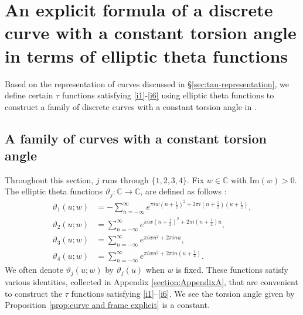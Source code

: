 \documentclass[10pt,leqno]{amsart}
\numberwithin{equation}{section}
\begin{document}
\section{An explicit formula of a discrete curve with a constant torsion angle in terms of elliptic theta functions}\label{section:An explicit formula of closed discrete space curve with constant torsion angle}
Based on the representation of curves 
discussed in \S \ref{sec:tau-representation},
we define certain $\tau$ functions satisfying \eqref{i1}-\eqref{i6} using elliptic theta functions to
construct a family of discrete curves with a constant torsion angle
in .

\subsection{A family of curves with a constant torsion angle}\label{subsection:A family of open curves with constant torsion angle}
Throughout this section, $j$ runs through $\{1,2,3,4\}$.
Fix $w\in\mathbb{C}$ with $\mathrm{Im}(w)>0$.
The elliptic theta functions 
$\vartheta_j: \mathbb{C} \to \mathbb{C}$,
 are defined as follows \cite{Mumford:Tata_I,Khachev_Zabrodin:theta}:
\begin{align}\label{theta1}
\vartheta_1 (u; w)
&= - \sum_{n=-\infty}^\infty e^{\pi i w \left(n + \frac{1}{2}\right)^2 + 2 \pi i \left(n + \frac{1}{2}\right)\left(u + \frac{1}{2}\right)},\\
\vartheta_2 (u; w)
&= \sum_{n=-\infty}^\infty e^{\pi i w \left(n + \frac{1}{2}\right)^2 + 2 \pi i \left(n + \frac{1}{2}\right) u}, \nonumber\\
\vartheta_3 (u; w)
&= \sum_{n=-\infty}^\infty e^{\pi i w n^2 + 2 \pi i n u}, \nonumber\\
\vartheta_4 (u; w)
&= \sum_{n=-\infty}^\infty e^{\pi i w n^2 + 2 \pi i n \left(u + \frac{1}{2}\right)}. \nonumber
\end{align}
We often denote $\vartheta_j(u; w)$ by $\vartheta_j(u)$
when $w$ is fixed.
These functions satisfy various identities, collected in Appendix \ref{section:AppendixA}, that are convenient to construct the $\tau$ functions 
satisfying \eqref{i1}–\eqref{i6}.
We see the torsion angle given by Proposition \ref{prop:curve and frame explicit} is a constant.
\end{document}
